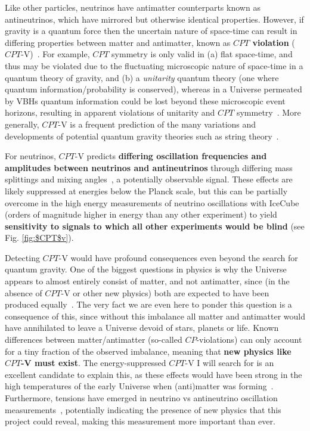 \documentclass[a4paper,11pt]{article}
\begin{document}
Like other particles, neutrinos have antimatter counterparts known as antineutrinos, which have mirrored but otherwise identical properties. However, if gravity is a quantum force then the uncertain nature of space-time  can result in differing properties between matter and antimatter, known as \textbf{$CPT$ violation} ($CPT$-V)~\cite{Mavromatos:2005mi, AmelinoCamelia:2008qg, RalfLehnert:2016grl}. For example, $CPT$ symmetry is only valid in (a) flat space-time, and thus may be violated due to the fluctuating microscopic nature of  space-time in a quantum theory of gravity, and (b) a \textit{unitarity} quantum theory (one where quantum information/probability is conserved), whereas in a Universe permeated by VBHs quantum information could be lost beyond these microscopic event horizons, resulting in apparent violations of unitarity and $CPT$ symmetry~\cite{Mavromatos:2005mi}. More generally, $CPT$-V is a frequent prediction of the many variations and developments of potential quantum gravity theories such as string theory~\cite{Mavromatos:2005mi, Hashimoto:2014aoa, Ellis:2013gca}.

For neutrinos, $CPT$-V predicts \textbf{differing oscillation frequencies and amplitudes between neutrinos and antineutrinos} through differing mass splittings and mixing angles~\cite{Barenboim:2017ewj}, a potentially observable signal. These effects are likely suppressed at energies below the Planck scale, but this can be partially overcome in the high energy measurements of neutrino oscillations with IceCube (orders of magnitude higher in energy than any other experiment) to yield \textbf{sensitivity to signals to which all other experiments would be blind} (see Fig. \ref{fig:$CPT$v}). 

Detecting $CPT$-V would have profound consequences even beyond the search for quantum gravity. One of the biggest questions in physics is why the Universe appears to almost entirely consist of matter, and not antimatter, since (in the absence of $CPT$-V or other new physics) both are expected to have been produced equally~\cite{Sakharov_1991}. The very fact we are even here to ponder this question is a consequence of this, since without this imbalance all matter and antimatter would have annihilated to leave a Universe devoid of stars, planets or life. Known differences between matter/antimatter (so-called $CP$-violations) can only account for a tiny fraction of the observed imbalance, meaning that \textbf{new physics like $CPT$-V must exist}. The energy-suppressed $CPT$-V I will search for is an excellent candidate to explain this, as these effects would have been strong in the high temperatures of the early Universe when (anti)matter was forming~\cite{Mavromatos:2017cxr, hep-ph/9809542, Ellis:2013gca}. Furthermore, tensions have emerged in neutrino vs antineutrino oscillation measurements~\cite{Abe:2019vii,NOvA_CP_result}, potentially indicating the presence of new physics that this project could reveal, making this measurement more important than ever.
\end{document}
